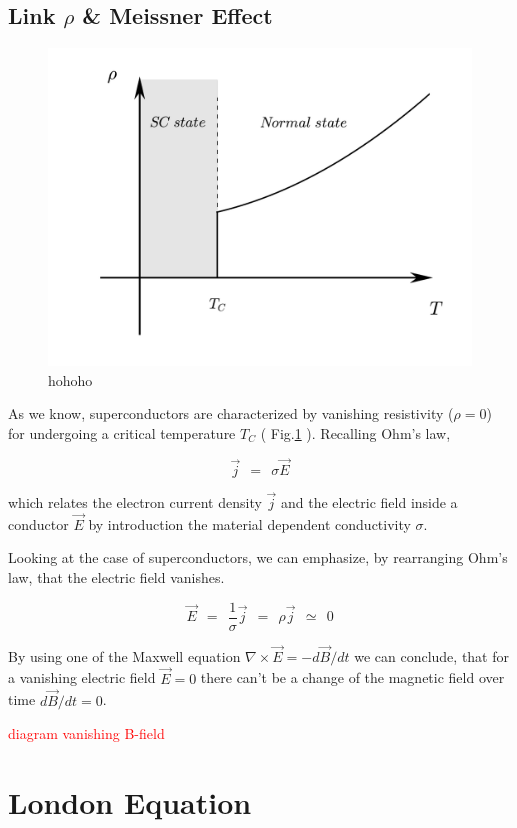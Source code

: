 \documentclass[10pt]{report}
\numberwithin{equation}{chapter}
\newcommand{\myRef}[1]{
  Fig.\ref{#1}
}
\begin{document}
\subsection{Link $\rho$ \& Meissner Effect}

\begin{figure}
  \centering
  \includegraphics[width=0.7\linewidth]{../img/sc_resistivity_drop.pdf}
  \caption{hohoho}
  \label{fig:sc_res_drop}
\end{figure}


As we know, superconductors are characterized by vanishing resistivity ($\rho=0$) for undergoing a critical temperature $T_C$ (\myRef{fig:sc_res_drop}).
Recalling Ohm's law, 

\begin{equation} \label{eq:ohms_law}
  \vec{j} ~~=~~ \sigma \vec{E}
\end{equation}


which relates the electron current density $\vec{j}$ and the electric field inside a conductor $\vec{E}$ by introduction the material dependent conductivity $\sigma$.

Looking at the case of superconductors, we can emphasize, by rearranging Ohm's law, that the electric field vanishes.

\begin{equation}
  \vec{E} ~~=~~ \frac{1}{\sigma} \vec{j} ~~=~~ \rho \vec{j} ~~≃~~ 0
\end{equation}

By using one of the Maxwell equation $\nabla \times \vec{E} = - d\vec{B}/ dt$ we can conclude, that for a vanishing electric field $\vec{E} = 0$ there can't be a change of the magnetic field over time $d\vec{B}/dt=0$.


\textcolor{red}{diagram vanishing B-field}


\section{London Equation}
\end{document}
